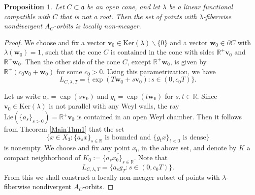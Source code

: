 \documentclass[reqno,12pt]{amsart}
\newtheorem{proposition}[theorem]{Proposition}
\theoremstyle{definition}
\numberwithin{equation}{section}
\newcommand{\RR}{\mathbb{R}}
\newcommand{\NN}{\mathbb{N}}
\newcommand{\bv}{\mathbf{v}}
\newcommand{\bw}{\mathbf{w}}
\newcommand{\Lie}{\mathrm{Lie}}
\renewcommand{\ker}{\mathrm{Ker}}
\newcommand {\ignore}[1]  {}
\renewcommand{\setminus}{\smallsetminus}
\begin{document}
{\begin{proposition}\label{P:nondiv}
    Let $C\subset\mathfrak{a}$ be an open cone\ignore{which is not a half-plane}, and let $\lambda$ be a linear functional compatible with $C$ that is not a root. %
    Then the set of points with $\lambda$-fiberwise nondivergent $A_C$-orbits is locally non-meager.
\end{proposition}
\begin{proof}
    We choose and fix a vector $\bv_0\in\ker(\lambda)\setminus \{0\}$ and a vector $\bw_0\in\partial C$ with $\lambda(\bw_0)=1$, such that the cone $C$ is contained in the cone with sides $\RR^+\bv_0$ and $\RR^+\bw_0$. Then the other side of the cone $C$, except $\RR^+\bw_0$, is given by $\RR^+(c_0\bv_0+\bw_0)$ for some $c_0>0$. Using this parametrization, we have $$
L_{C,\lambda,T}=\{\exp(T\bw_0+s\bv_0): s\in (0,c_0T)\}.
$$

	Let us write $a_s=\exp(s\bv_0)$ and $g_t=\exp(t\bw_0)$ for $s,t\in\RR$. Since $\bv_0\in\ker(\lambda)$ is not parallel with any Weyl walls, the ray $\Lie(\{a_s\}_{s>0})=\RR^+\bv_0$ is contained in an open Weyl chamber. Then it follows from Theorem \ref{MainThm1} that the set \begin{equation*}
		\{x\in X_3:
		\{a_sx\}_{s\in\RR} \text{ is bounded and } \{g_tx\}_{t<0} \text{ is dense}
		\}
	\end{equation*}
	is nonempty. We choose and fix any point $x_0$ in the above set, and denote by $K$ a compact neighborhood of $K_0:=\overline{\{a_sx_0\}_{s\in\RR}}$. Note that 
	\begin{equation*}
		L_{C,\lambda,T}=\{a_sg_T:s\in (0,c_0T)\}.
	\end{equation*}
	From this we shall construct a locally non-meager subset of points with $\lambda$-fiberwise nondivergent $A_C$-orbits.
	

\end{proof}}
\end{document}
